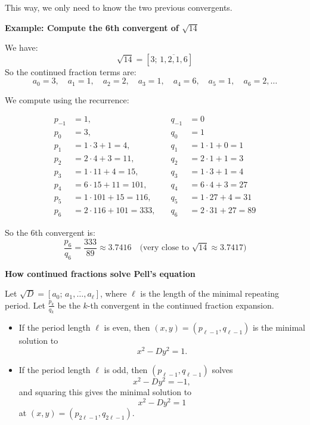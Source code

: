 \documentclass[11pt]{article}
\begin{document}
This way, we only need to know the two previous convergents.

\bigskip
\noindent
\textbf{Example: Compute the 6th convergent of \( \sqrt{14} \)}

We have:
\[
\sqrt{14} = [3;\, \overline{1,2,1,6}]
\]
So the continued fraction terms are:
\[
a_0 = 3,\quad a_1 = 1,\quad a_2 = 2,\quad a_3 = 1,\quad a_4 = 6,\quad a_5 = 1,\quad a_6 = 2,\dots
\]

We compute using the recurrence:

\[
\begin{aligned}
p_{-1} &= 1,\quad &q_{-1} &= 0 \\
p_0 &= 3,\quad &q_0 &= 1 \\
p_1 &= 1 \cdot 3 + 1 = 4,\quad &q_1 &= 1 \cdot 1 + 0 = 1 \\
p_2 &= 2 \cdot 4 + 3 = 11,\quad &q_2 &= 2 \cdot 1 + 1 = 3 \\
p_3 &= 1 \cdot 11 + 4 = 15,\quad &q_3 &= 1 \cdot 3 + 1 = 4 \\
p_4 &= 6 \cdot 15 + 11 = 101,\quad &q_4 &= 6 \cdot 4 + 3 = 27 \\
p_5 &= 1 \cdot 101 + 15 = 116,\quad &q_5 &= 1 \cdot 27 + 4 = 31 \\
p_6 &= 2 \cdot 116 + 101 = 333,\quad &q_6 &= 2 \cdot 31 + 27 = 89
\end{aligned}
\]

So the 6th convergent is:
\[
\frac{p_6}{q_6} = \frac{333}{89} \approx 3.7416 \quad \text{(very close to } \sqrt{14} \approx 3.7417\text{)}
\]

\smallskip
\noindent
\textbf{How continued fractions solve Pell’s equation}

Let \( \sqrt{D} = [a_0;\, \overline{a_1,\dots,a_\ell}] \), where \( \ell \) is the length of the minimal repeating period. Let \( \frac{p_k}{q_k} \) be the $k$-th convergent in the continued fraction expansion.

\begin{itemize}
  \item If the period length \( \ell \) is even, then \( (x, y) = (p_{\ell - 1}, q_{\ell - 1}) \) is the minimal solution to
  \[
  x^2 - D y^2 = 1.
  \]
  \item If the period length \( \ell \) is odd, then \( (p_{\ell - 1}, q_{\ell - 1}) \) solves
  \[
  x^2 - D y^2 = -1,
  \]
  and squaring this gives the minimal solution to
  \[
  x^2 - D y^2 = 1
  \]
  at \( (x, y) = (p_{2\ell - 1}, q_{2\ell - 1}) \).
\end{itemize}
\end{document}
